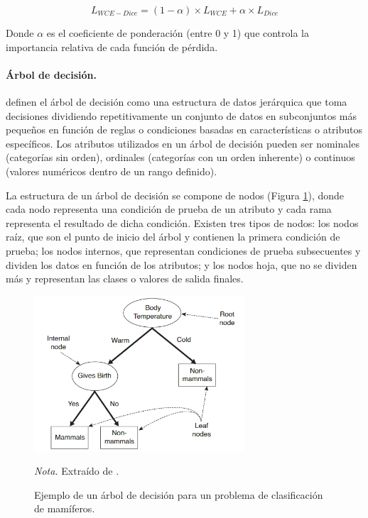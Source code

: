 \begin{equation}
    L_{WCE - Dice} = (1 -\alpha) \times L_{WCE} + \alpha \times L_{Dice}
    \label{eq:wbce_dice}
\end{equation}

Donde $\alpha$ es el coeficiente de ponderación (entre 0 y 1) que controla la importancia relativa de cada función de pérdida.

\paragraph{Árbol de decisión.}
\citet{Steinbach2004DataMC} definen el árbol de decisión como una estructura de datos jerárquica que toma decisiones dividiendo repetitivamente un conjunto de datos 
en subconjuntos más pequeños en función de reglas o condiciones basadas en características o atributos específicos. Los atributos utilizados en un árbol 
de decisión pueden ser nominales (categorías sin orden), ordinales (categorías con un orden inherente) o continuos (valores numéricos dentro de un rango definido). 

La estructura de un árbol de decisión se compone de nodos (Figura \ref{fig:decision_tree}), donde cada nodo representa una condición de prueba de un atributo y cada rama 
representa el resultado de dicha condición. Existen tres tipos de nodos: los nodos raíz, 
que son el punto de inicio del árbol y contienen la primera condición de prueba; los nodos internos, que representan condiciones de prueba subsecuentes y dividen los datos 
en función de los atributos; y los nodos hoja, que no se dividen más y representan las clases o valores de salida finales.

\begin{figure}[H]
    \centering
    \caption{Ejemplo de un árbol de decisión para un problema de clasificación de mamíferos.}
    \includegraphics[width=0.7\textwidth]{img/4_marco_teorico/decision_tree.png}
    \label{fig:decision_tree}
    \begin{flushleft}
        \textit{Nota.} Extraído de \citet{Steinbach2004DataMC}. 
        \vspace{-\baselineskip}       
    \end{flushleft}
\end{figure}

